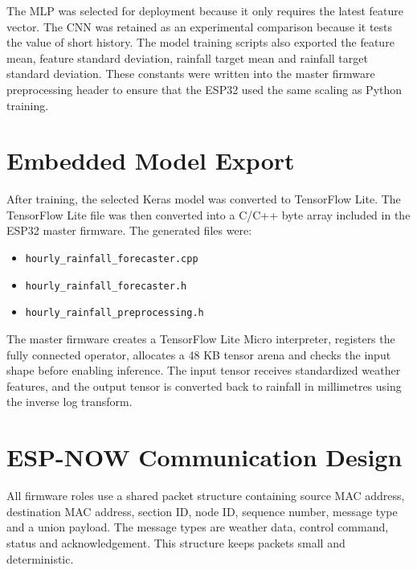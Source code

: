 \documentclass[12pt,a4paper]{report}
\begin{document}
The MLP was selected for deployment because it only requires the latest feature vector. The CNN was retained as an experimental comparison because it tests the value of short history. The model training scripts also exported the feature mean, feature standard deviation, rainfall target mean and rainfall target standard deviation. These constants were written into the master firmware preprocessing header to ensure that the ESP32 used the same scaling as Python training.

\section{Embedded Model Export}
After training, the selected Keras model was converted to TensorFlow Lite. The TensorFlow Lite file was then converted into a C/C++ byte array included in the ESP32 master firmware. The generated files were:
\begin{itemize}
	\item \texttt{hourly\_rainfall\_forecaster.cpp}
	\item \texttt{hourly\_rainfall\_forecaster.h}
	\item \texttt{hourly\_rainfall\_preprocessing.h}
\end{itemize}

The master firmware creates a TensorFlow Lite Micro interpreter, registers the fully connected operator, allocates a 48 KB tensor arena and checks the input shape before enabling inference. The input tensor receives standardized weather features, and the output tensor is converted back to rainfall in millimetres using the inverse log transform.

\section{ESP-NOW Communication Design}
All firmware roles use a shared packet structure containing source MAC address, destination MAC address, section ID, node ID, sequence number, message type and a union payload. The message types are weather data, control command, status and acknowledgement. This structure keeps packets small and deterministic.
\end{document}
